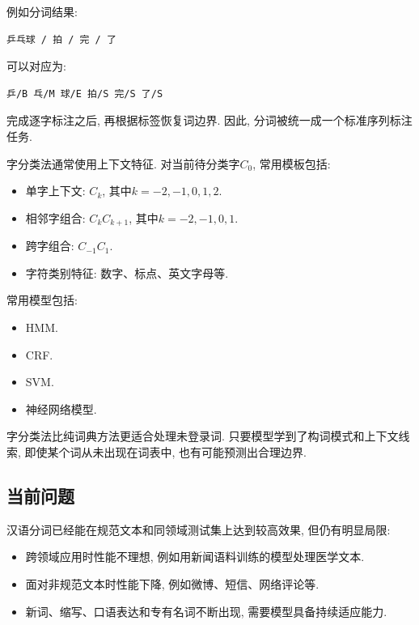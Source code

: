 例如分词结果:

\begin{Verbatim}[breaklines=true,breakanywhere=true,fontsize=\small]
乒乓球 / 拍 / 完 / 了
\end{Verbatim}

可以对应为:

\begin{Verbatim}[breaklines=true,breakanywhere=true,fontsize=\small]
乒/B 乓/M 球/E 拍/S 完/S 了/S
\end{Verbatim}

完成逐字标注之后, 再根据标签恢复词边界.
因此, 分词被统一成一个标准序列标注任务.

字分类法通常使用上下文特征.
对当前待分类字$C_0$, 常用模板包括:

\begin{itemize}
\item 单字上下文: $C_k$, 其中$k=-2,-1,0,1,2$.
\item 相邻字组合: $C_k C_{k+1}$, 其中$k=-2,-1,0,1$.
\item 跨字组合: $C_{-1} C_1$.
\item 字符类别特征: 数字、标点、英文字母等.
\end{itemize}

常用模型包括:

\begin{itemize}
\item HMM.
\item CRF.
\item SVM.
\item 神经网络模型.
\end{itemize}

字分类法比纯词典方法更适合处理未登录词.
只要模型学到了构词模式和上下文线索, 即使某个词从未出现在词表中, 也有可能预测出合理边界.

\subsection{当前问题}


汉语分词已经能在规范文本和同领域测试集上达到较高效果, 但仍有明显局限:

\begin{itemize}
\item 跨领域应用时性能不理想, 例如用新闻语料训练的模型处理医学文本.
\item 面对非规范文本时性能下降, 例如微博、短信、网络评论等.
\item 新词、缩写、口语表达和专有名词不断出现, 需要模型具备持续适应能力.
\end{itemize}


